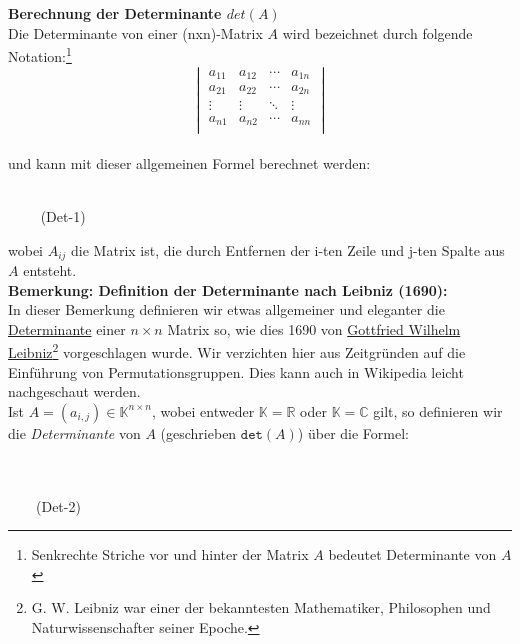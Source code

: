 \documentclass[12pt]{article}
\begin{document}
%
\textbf{Berechnung der Determinante $det(A)$}\\[0.2cm]
Die Determinante von  einer (nxn)-Matrix $A$ wird bezeichnet durch folgende {Notation:\footnote{Senkrechte  Striche vor und hinter der Matrix $A$ bedeutet Determinante von $A$}}
\[
\begin{vmatrix}
    a_{11} & a_{12} & \cdots & a_{1n} \\
    a_{21} & a_{22} & \cdots & a_{2n} \\
    \vdots & \vdots & \ddots & \vdots \\
    a_{n1} & a_{n2} & \cdots & a_{nn} \\
\end{vmatrix}
\]
\\[0.4cm]
und kann mit dieser allgemeinen Formel berechnet werden:
\begin{large}
\\[0.5cm]
\hspace*{3.0cm}
\colorbox{blue}{} $ \qquad $ (Det-1)\\[0.5cm]
\end{large}
wobei $A_{ij}$ die Matrix ist, die durch Entfernen der i-ten Zeile und j-ten Spalte aus $A$ entsteht.\\[0.8cm]
\textbf{Bemerkung: Definition der Determinante nach Leibniz (1690):}\\[0.4cm]
In dieser Bemerkung definieren wir etwas allgemeiner und eleganter die \href{https://de.wikipedia.org/wiki/Determinante}{Determinante} einer $n \times n$ Matrix so, wie dies 1690 von \href{http://de.wikipedia.org/wiki/Gottfried_Wilhelm_Leibniz}{Gottfried Wilhelm Leibniz\footnote{G. W. Leibniz war einer der bekanntesten Mathematiker, Philosophen und Naturwissenschafter seiner Epoche.}} vorgeschlagen wurde. Wir verzichten hier aus Zeitgründen auf die Einführung von Permutationsgruppen. Dies kann auch in Wikipedia leicht nachgeschaut werden.\\[0.2cm]
Ist $A = (a_{i,j}) \in \mathbb{K}^{n \times n}$, wobei entweder 
$\mathbb{K}= \mathbb{R}$ oder $\mathbb{K}= \mathbb{C}$ gilt, so definieren wir die {\emph{\color{blue}Determinante}} von $A$ (geschrieben $\mathtt{det}(A)$) über die Formel:
\begin{large}
\\[0.6cm]
\hspace*{0.0cm}
\colorbox{blue}{} \\ $ \qquad $(Det-2)\\[0.6cm]
\end{large}
\end{document}
